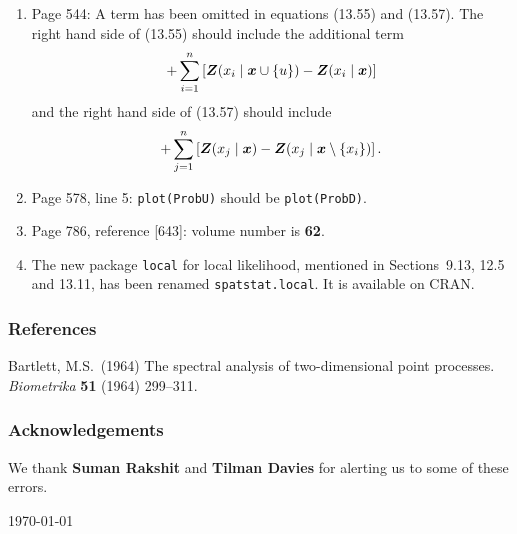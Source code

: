 \documentclass[12pt,a4paper]{article}
\newcommand{\boldmaths}[1]{{\ensuremath\boldsymbol{#1}}}
\newcommand{\bx}{\boldmaths x}
\newcommand{\bZ}{\boldmaths Z}
\begin{document}
\begin{enumerate}
\item Page 544: A term has been omitted in equations (13.55) and (13.57).
The right hand side of (13.55) should include the additional term
\[
   + \sum_{i=1}^n \left[ \bZ(x_i \mid \bx \cup \{u\}) - \bZ(x_i \mid \bx) \right]
\]
and the right hand side of (13.57) should include
\[
  + \sum_{j=1}^n \left[ \bZ(x_j \mid \bx) - \bZ(x_j \mid \bx \setminus \{x_i\}) \right].
\]
\item Page 578, line 5: \texttt{plot(ProbU)} should be \texttt{plot(ProbD)}.
\item Page 786, reference [643]: volume number is \textbf{62}.
\item
  The new package \texttt{local} for local likelihood, mentioned
  in Sections~9.13, 12.5 and 13.11, has been renamed \texttt{spatstat.local}.
  It is available on CRAN.
\end{enumerate}

\subsubsection*{References}

Bartlett, M.S.\ (1964)
The spectral analysis of two-dimensional point processes.
\emph{Biometrika} \textbf{51} (1964) 299--311.

\subsubsection*{Acknowledgements}

We thank \textbf{Suman Rakshit} and \textbf{Tilman Davies}
for alerting us to some of these errors.\\


\vspace*{\fill}


\hspace*{\fill} \today
\end{document}
